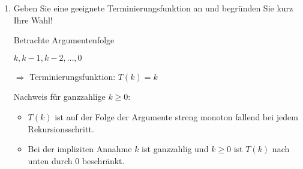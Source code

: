 \documentclass{lehramt-informatik-minimal}
\begin{document}
\begin{enumerate}
\begin{antwort}
\end{antwort}


\item Geben Sie eine geeignete Terminierungsfunktion an und begründen
Sie kurz Ihre Wahl!

\begin{antwort}
Betrachte Argumentenfolge

$k, k-1, k-2, \dots, 0$

$\Rightarrow$ Terminierungsfunktion: $T(k) = k$

Nachweis für ganzzahlige $k \geq 0$:

\begin{itemize}
\item $T(k)$ ist auf der Folge der Argumente streng monoton fallend bei
jedem Rekursionsschritt.

\item Bei der impliziten Annahme $k$ ist ganzzahlig und $k \geq 0$ ist
$T(k)$ nach unten durch $0$ beschränkt.
\end{itemize}

\end{antwort}

\end{enumerate}
\end{document}
